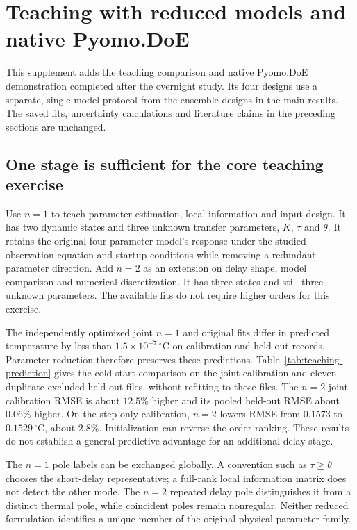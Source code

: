 \section{Teaching with reduced models and native Pyomo.DoE}
\label{sec:teaching-doe}
This supplement adds the teaching comparison and native Pyomo.DoE demonstration
completed after the overnight study. Its four designs use a separate,
single-model protocol from the ensemble designs in the main results. The saved
fits, uncertainty calculations and literature claims in the preceding sections
are unchanged.

\subsection{One stage is sufficient for the core teaching exercise}
Use $n=1$ to teach parameter estimation, local information and input design.
It has two dynamic states and three unknown transfer parameters, $K$, $\tau$
and $\theta$. It retains the original four-parameter model's response under the
studied observation equation and startup conditions while removing a redundant
parameter direction. Add $n=2$ as an extension on delay shape, model comparison
and numerical discretization. It has three states and still three unknown
parameters. The available fits do not require higher orders for this exercise.

The independently optimized joint $n=1$ and original fits differ in predicted
temperature by less than $1.5\times10^{-7}\,{}^\circ\mathrm C$ on calibration
and held-out records. Parameter reduction therefore preserves these predictions.
Table~\ref{tab:teaching-prediction} gives the cold-start comparison on the joint
calibration and eleven duplicate-excluded held-out files, without refitting
to those files. The $n=2$ joint calibration RMSE is about $12.5\%$ higher and
its pooled held-out RMSE about $0.06\%$ higher. On the step-only calibration,
$n=2$ lowers RMSE from $0.1573$ to $0.1529\,{}^\circ\mathrm C$, about $2.8\%$.
Initialization can reverse the order ranking. These results do not establish a
general predictive advantage for an additional delay stage.


The $n=1$ pole labels can be exchanged globally. A convention such as
$\tau\geq\theta$ chooses the short-delay representative; a full-rank local
information matrix does not detect the other mode. The $n=2$ repeated delay pole
distinguishes it from a distinct thermal pole, while coincident poles remain
nonregular. Neither reduced formulation identifies a unique member of the
original physical parameter family.

